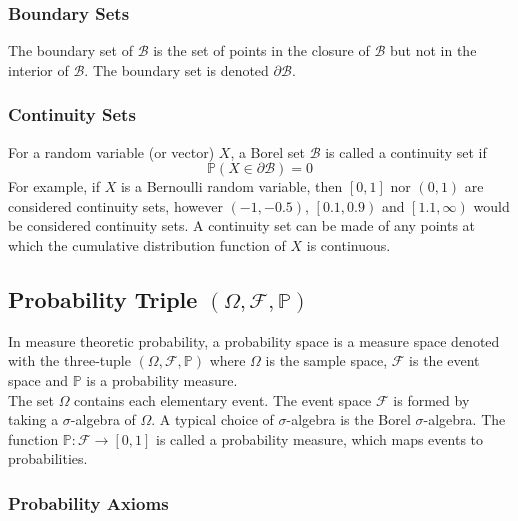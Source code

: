 \documentclass[11pt]{report} %
\begin{document}
\subsubsection{Boundary Sets}

The boundary set of $\mathcal{B}$ is the set of points in the closure of $\mathcal{B}$ but not in the interior of $\mathcal{B}$. The boundary set is denoted $\partial\mathcal{B}$.

\subsubsection{Continuity Sets}

For a random variable (or vector) $X$, a Borel set $\mathcal{B}$ is called a continuity set if
\begin{equation}
\mathbb{P}\left(X\in \partial\mathcal{B}\right) = 0
\end{equation}
For example, if $X$ is a Bernoulli random variable, then $\left[0, 1\right]$ nor $\left(0, 1\right)$ are considered continuity sets, however $\left(-1, -0.5\right)$, $\left[0.1, 0.9\right)$ and $\left[1.1, \infty\right)$ would be considered continuity sets. A continuity set can be made of any points at which the cumulative distribution function of $X$ is continuous.

\subsection{Probability Triple $\left(\Omega, \mathcal{F}, \mathbb{P}\right)$}
In measure theoretic probability, a probability space is a measure space denoted with the three-tuple $\left(\Omega, \mathcal{F}, \mathbb{P}\right)$ where $\Omega$ is the sample space, $\mathcal{F}$ is the event space and $\mathbb{P}$ is a probability measure. \\

The set $\Omega$ contains each elementary event. The event space $\mathcal{F}$ is formed by taking a $\sigma$-algebra of $\Omega$. A typical choice of $\sigma$-algebra is the Borel $\sigma$-algebra. The function $\mathbb{P}: \mathcal{F} \to \left[0, 1\right]$ is called a probability measure, which maps events to probabilities.

\subsubsection{Probability Axioms}
\end{document}
